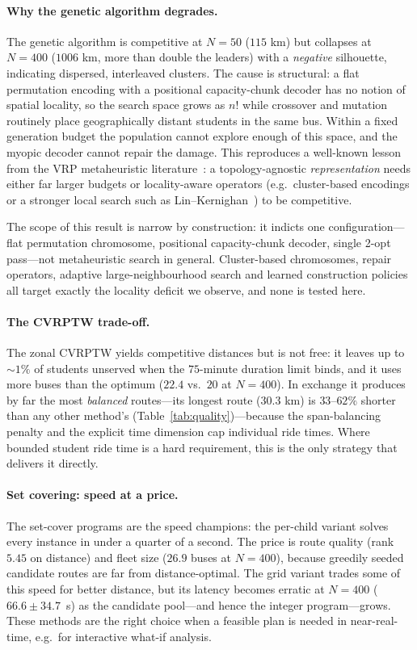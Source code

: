 \documentclass[runningheads]{llncs}
\begin{document}
\paragraph{Why the genetic algorithm degrades.}
The genetic algorithm is competitive at $N=50$ ($115$ km) but collapses
at $N=400$ ($1006$ km, more than double the leaders) with a
\emph{negative} silhouette, indicating dispersed, interleaved clusters.
The cause is structural: a flat permutation encoding with a positional
capacity-chunk decoder has no notion of spatial locality, so the search
space grows as $n!$ while crossover and mutation routinely place
geographically distant students in the same bus. Within a fixed
generation budget the population cannot explore enough of this space,
and the myopic decoder cannot repair the damage. This reproduces a
well-known lesson from the VRP metaheuristic
literature~\cite{Baranwal2016DAVRPTW,Hatamlou2018BlackHole}: a
topology-agnostic \emph{representation} needs either far larger budgets
or locality-aware operators (e.g.\ cluster-based encodings or a
stronger local search such as
Lin--Kernighan~\cite{HelsgaunAnHeuristic}) to be competitive.

The scope of this result is narrow by construction: it indicts one
configuration---flat permutation chromosome, positional capacity-chunk
decoder, single 2-opt pass---not metaheuristic search in general.
Cluster-based chromosomes, repair operators, adaptive
large-neighbourhood search and learned construction
policies~\cite{Wu2024NCOSurvey} all target exactly the locality deficit
we observe, and none is tested here.

\paragraph{The CVRPTW trade-off.}
The zonal CVRPTW yields competitive distances but is not free: it
leaves up to ${\sim}1\%$ of students unserved when the $75$-minute
duration limit binds, and it uses more buses than the optimum
($22.4$ vs.\ $20$ at $N=400$). In exchange it produces by far the most
\emph{balanced} routes---its longest route ($30.3$ km) is
$33$--$62\%$ shorter than any other method's
(Table~\ref{tab:quality})---because the span-balancing penalty and the
explicit time dimension cap individual ride times. Where bounded
student ride time is a hard requirement, this is the only strategy that
delivers it directly.

\paragraph{Set covering: speed at a price.}
The set-cover programs are the speed champions: the per-child variant
solves every instance in under a quarter of a second. The price is route quality
(rank $5.45$ on distance) and fleet size ($26.9$ buses at $N=400$),
because greedily seeded candidate routes are far from distance-optimal.
The grid variant trades some of this speed for better distance, but its
latency becomes erratic at $N=400$ ($66.6\pm34.7$~s) as the candidate
pool---and hence the integer program---grows. These methods are the
right choice when a feasible plan is needed in near-real-time, e.g.\ for
interactive what-if analysis.
\end{document}
